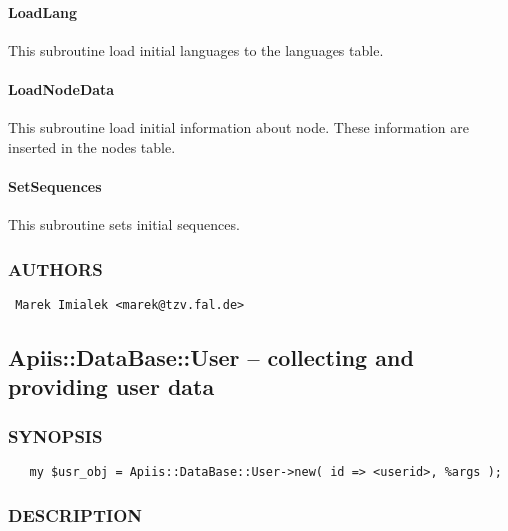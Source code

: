 \paragraph*{LoadLang\label{DBCreation_pm_LoadLang}}


This subroutine load initial languages to the languages table.

\paragraph*{LoadNodeData\label{DBCreation_pm_LoadNodeData}}


This subroutine load initial information about node. These information are inserted in the nodes table.

\paragraph*{SetSequences\label{DBCreation_pm_SetSequences}}


This subroutine sets initial sequences.

\subsubsection*{AUTHORS\label{DBCreation_pm_AUTHORS}}
\begin{verbatim}
 Marek Imialek <marek@tzv.fal.de>
\end{verbatim}
\subsection{Apiis::DataBase::User -- collecting and providing user data\label{Apiis::DataBase::User_--_collecting_and_providing_user_data}}




\subsubsection*{SYNOPSIS\label{Apiis::DataBase::User_--_collecting_and_providing_user_data_SYNOPSIS}}
\begin{verbatim}
   my $usr_obj = Apiis::DataBase::User->new( id => <userid>, %args );
\end{verbatim}
\subsubsection*{DESCRIPTION\label{Apiis::DataBase::User_--_collecting_and_providing_user_data_DESCRIPTION}}



